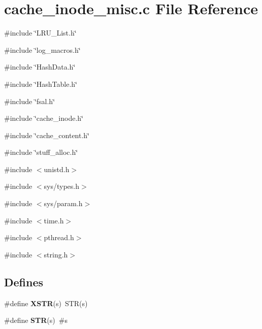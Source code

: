 \section{cache\_\-inode\_\-misc.c File Reference}
\label{cache__inode__misc_8c}
{\ttfamily \#include \char`\"{}LRU\_\-List.h\char`\"{}}\par
{\ttfamily \#include \char`\"{}log\_\-macros.h\char`\"{}}\par
{\ttfamily \#include \char`\"{}HashData.h\char`\"{}}\par
{\ttfamily \#include \char`\"{}HashTable.h\char`\"{}}\par
{\ttfamily \#include \char`\"{}fsal.h\char`\"{}}\par
{\ttfamily \#include \char`\"{}cache\_\-inode.h\char`\"{}}\par
{\ttfamily \#include \char`\"{}cache\_\-content.h\char`\"{}}\par
{\ttfamily \#include \char`\"{}stuff\_\-alloc.h\char`\"{}}\par
{\ttfamily \#include $<$unistd.h$>$}\par
{\ttfamily \#include $<$sys/types.h$>$}\par
{\ttfamily \#include $<$sys/param.h$>$}\par
{\ttfamily \#include $<$time.h$>$}\par
{\ttfamily \#include $<$pthread.h$>$}\par
{\ttfamily \#include $<$string.h$>$}\par
\subsection*{Defines}
\begin{DoxyCompactItemize}
\item 
\#define {\bf XSTR}(s)~STR(s)
\item 
\#define {\bf STR}(s)~\#s
\end{DoxyCompactItemize}
